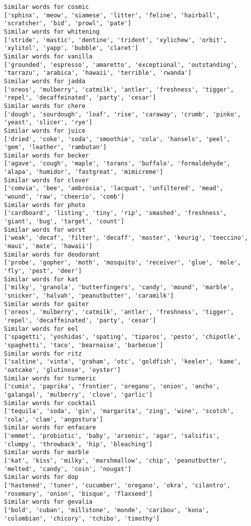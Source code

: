 \documentclass[11pt]{article}
\begin{document}
\begin{Verbatim}[commandchars=\\\{\}]
Similar words for cosmic
['sphinx', 'meow', 'siamese', 'litter', 'feline', 'hairball', 'scratcher', 'bid', 'prowl', 'pate']
Similar words for whitening
['stride', 'mastic', 'dentine', 'trident', 'xylichew', 'orbit', 'xylitol', 'yapp', 'bubble', 'claret']
Similar words for vanilla
['grounded', 'espresso', 'amaretto', 'exceptional', 'outstanding', 'tarrazu', 'arabica', 'hawaii', 'terrible', 'rwanda']
Similar words for jadda
['oreos', 'mulberry', 'catmilk', 'antler', 'freshness', 'tigger', 'repel', 'decaffeinated', 'party', 'cesar']
Similar words for chere
['dough', 'sourdough', 'loaf', 'rise', 'caraway', 'crumb', 'pinko', 'yeast', 'slicer', 'rye']
Similar words for juice
['dried', 'coke', 'soda', 'smoothie', 'cola', 'hansels', 'peel', 'gem', 'leather', 'rambutan']
Similar words for becker
['agave', 'cough', 'maple', 'torans', 'buffalo', 'formaldehyde', 'alapa', 'humidor', 'fastgreat', 'mimicreme']
Similar words for clover
['comvia', 'bee', 'ambrosia', 'lacquat', 'unfiltered', 'mead', 'wound', 'raw', 'cheerio', 'comb']
Similar words for photo
['cardboard', 'listing', 'tiny', 'rip', 'smashed', 'freshness', 'giant', 'bug', 'target', 'count']
Similar words for worst
['weak', 'decaf', 'filter', 'decaff', 'master', 'keurig', 'teeccino', 'maui', 'mate', 'hawaii']
Similar words for deodorant
['probe', 'gopher', 'moth', 'mosquito', 'receiver', 'glue', 'mole', 'fly', 'pest', 'deer']
Similar words for kat
['milky', 'granola', 'butterfingers', 'candy', 'mound', 'marble', 'snicker', 'halvah', 'peanutbutter', 'caramilk']
Similar words for gaiter
['oreos', 'mulberry', 'catmilk', 'antler', 'freshness', 'tigger', 'repel', 'decaffeinated', 'party', 'cesar']
Similar words for eel
['spagetti', 'yoshidas', 'spating', 'tiparos', 'pesto', 'chipotle', 'spaghetti', 'taco', 'bearnaise', 'barbecue']
Similar words for ritz
['saltine', 'vinta', 'graham', 'otc', 'goldfish', 'keeler', 'kame', 'oatcake', 'glutinose', 'oyster']
Similar words for turmeric
['cumin', 'paprika', 'frontier', 'oregano', 'onion', 'ancho', 'galangal', 'mulberry', 'clove', 'garlic']
Similar words for cocktail
['tequila', 'soda', 'gin', 'margarita', 'zing', 'wine', 'scotch', 'cola', 'clam', 'angostura']
Similar words for enfacare
['emmet', 'probiotic', 'baby', 'arsenic', 'agar', 'salsifis', 'clumpy', 'throwback', 'hip', 'bleaching']
Similar words for marble
['kat', 'kiss', 'milky', 'marshmallow', 'chip', 'peanutbutter', 'melted', 'candy', 'coin', 'nougat']
Similar words for dop
['hastened', 'tuner', 'cucumber', 'oregano', 'okra', 'cilantro', 'rosemary', 'onion', 'bisque', 'flaxseed']
Similar words for gevalia
['bold', 'cuban', 'millstone', 'monde', 'caribou', 'kona', 'colombian', 'chicory', 'tchibo', 'timothy']

\end{Verbatim}
\end{document}
